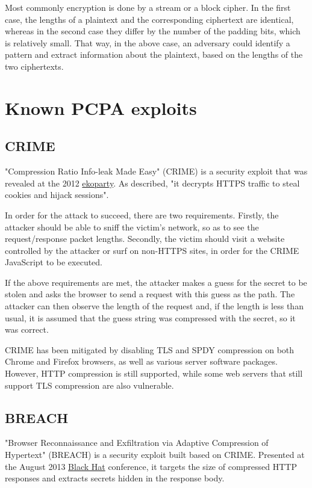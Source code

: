 Most commonly encryption is done by a stream or a block cipher. In the first
case, the lengths of a plaintext and the corresponding ciphertext are identical,
whereas in the second case they differ by the number of the padding bits, which
is relatively small. That way, in the above case, an adversary could identify a
pattern and extract information about the plaintext, based on the lengths of the
two ciphertexts.

\section{Known PCPA exploits}\label{sec:known_pcpa}

\subsection{CRIME}

"Compression Ratio Info-leak Made Easy" (CRIME) \cite{crime} is a security exploit
that was revealed at the 2012 \href{https://www.ekoparty.org}{ekoparty}. As
described, "it decrypts HTTPS traffic to steal cookies and hijack sessions".

In order for the attack to succeed, there are two requirements. Firstly, the
attacker should be able to sniff the victim's network, so as to see the
request/response packet lengths. Secondly, the victim should visit a website
controlled by the attacker or surf on non-HTTPS sites, in order for the CRIME
JavaScript to be executed.

If the above requirements are met, the attacker makes a guess for the secret to
be stolen and asks the browser to send a request with this guess as the path.
The attacker can then observe the length of the request and, if the length is
less than usual, it is assumed that the guess string was compressed with the
secret, so it was correct.

CRIME has been mitigated by disabling TLS and SPDY compression on both Chrome
and Firefox browsers, as well as various server software packages. However, HTTP
compression is still supported, while some web servers that still support TLS
compression are also vulnerable.

\subsection{BREACH}

"Browser Reconnaissance and Exfiltration via Adaptive Compression of Hypertext"
(BREACH) \cite{breach} is a security exploit built based on CRIME. Presented at
the August 2013 \href{https://www.blackhat.com}{Black Hat} conference, it
targets the size of compressed HTTP responses and extracts secrets hidden in the
response body.


